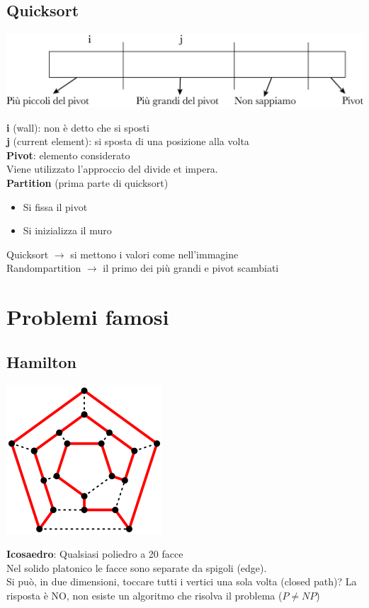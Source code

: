 \documentclass[12pt,a4paper]{article}
\begin{document}
\subsection{Quicksort}
\begin{center}
\includegraphics[width=1\columnwidth]{img/quicksort.png}
\end{center}
\textbf{i} (wall): non è detto che si sposti\\
\textbf{j} (current element): si sposta di una posizione alla volta\\
\textbf{Pivot}: elemento considerato\\
Viene utilizzato l'approccio del divide et impera.\\
\textbf{Partition} (prima parte di quicksort)
\begin{itemize}
\item Si fissa il pivot\\
\item Si inizializza il muro\\
\end{itemize}
Quicksort $\rightarrow$ si mettono i valori come nell'immagine\\
Randompartition $\rightarrow$ il primo dei più grandi e pivot scambiati

\clearpage
\section{Problemi famosi}
\subsection{Hamilton}
\begin{center}
\includegraphics[width=0.4\columnwidth]{img/hamilton.png}
\end{center}
\textbf{Icosaedro}: Qualsiasi poliedro a 20 facce\\
Nel solido platonico le facce sono separate da spigoli (edge).\\
Si può, in due dimensioni, toccare tutti i vertici una sola volta (closed path)? La risposta è NO, non esiste un algoritmo che risolva il problema ($P \not = NP$)
\end{document}

